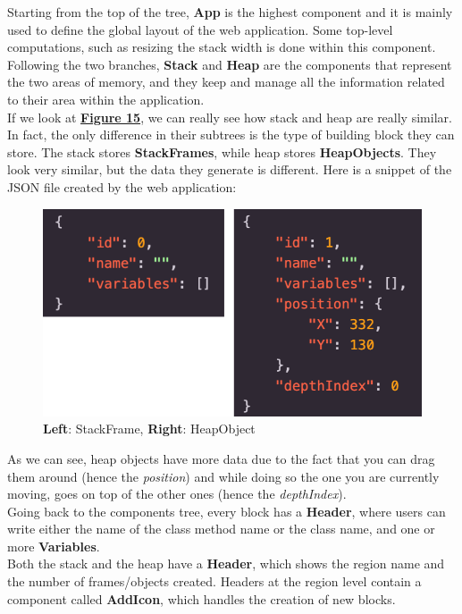 \documentclass[]{usiinfbachelorproject}
\begin{document}
\noindent Starting from the top of the tree, \textbf{App} is the highest component and it is mainly used to define the global layout of the web application. Some top-level computations, such as resizing the stack width is done within this component.\\
Following the two branches, \textbf{Stack} and \textbf{Heap} are the components that represent the two areas of memory, and they keep and manage all the information related to their area within the application.\\
If we look at \textbf{\hyperref[tree]{Figure 15}}, we can really see how stack and heap are really similar. In fact, the only difference in their subtrees is the type of building block they can store. The stack stores \textbf{StackFrames}, while heap stores \textbf{HeapObjects}. They look very similar, but the data they generate is different. Here is a snippet of the JSON file created by the web application:\\

\begin{figure}[h!]
\centering
\includegraphics[scale=.3]{figures/blocks_data.png}
\caption {\textbf{Left}: StackFrame, \textbf{Right}: HeapObject}
\label{tree}
\end{figure}

\noindent As we can see, heap objects have more data due to the fact that you can drag them around (hence the \emph{position}) and while doing so the one you are currently moving, goes on top of the other ones (hence the \emph{depthIndex}).\\
Going back to the components tree, every block has a \textbf{Header}, where users can write either the name of the class method name or the class name, and one or more \textbf{Variables}.\\
Both the stack and the heap have a \textbf{Header}, which shows the region name and the number of frames/objects created. Headers at the region level contain a component called \textbf{AddIcon}, which handles the creation of new blocks.
\end{document}
